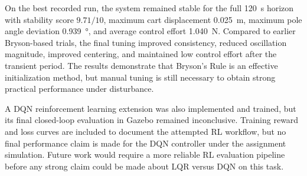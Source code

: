 \documentclass[11pt]{article}
\begin{document}
On the best recorded run, the system remained stable for the full \SI{120}{s} horizon with stability score $9.71/10$, maximum cart displacement \SI{0.025}{m}, maximum pole angle deviation \SI{0.939}{\degree}, and average control effort \SI{1.040}{N}. Compared to earlier Bryson-based trials, the final tuning improved consistency, reduced oscillation magnitude, improved centering, and maintained low control effort after the transient period. The results demonstrate that Bryson's Rule is an effective initialization method, but manual tuning is still necessary to obtain strong practical performance under disturbance.

A DQN reinforcement learning extension was also implemented and trained, but its final closed-loop evaluation in Gazebo remained inconclusive. Training reward and loss curves are included to document the attempted RL workflow, but no final performance claim is made for the DQN controller under the assignment simulation. Future work would require a more reliable RL evaluation pipeline before any strong claim could be made about LQR versus DQN on this task.
\end{document}
